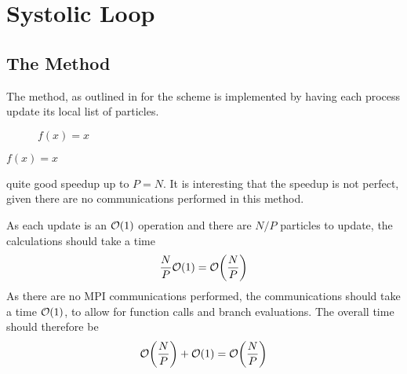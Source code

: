 \section{Systolic Loop}

%
%

\subsection{The \individualoperation{} Method}

The \individualoperation{} method, as outlined in
for the \systolicloop{} scheme
is implemented by having each process update its local list of particles.


%
%
\begin{figure}[!h]
    
    \caption{
        \vZeroSpeedupCaption
            {\systolicloop{}}
            {\individualoperation{}}
            {$f(x) = x$}
    }
    \label{fig:v0_systolic_individual_operation_speedups}
\end{figure}


\vZeroSpeedupExplanation
    {}
    {\systolicloop{}}
    {\individualoperation{}}
    {$f(x) = x$}


%

 quite good speedup
up to $P = N$.
%
It is interesting that the speedup is not perfect, given there are
no communications performed in this method.

%
As each update is an $\mathcal{O}{\left({ 1 }\right)}$ operation and there are $N/P$ particles
to update,
the calculations should take a time
\begin{equation}
    \frac{N}{P}\mathcal{O}{\left({ 1 }\right)} = \mathcal{O}{\left({ \frac{N}{P} }\right)}
\end  {equation}
%
As there are no MPI communications performed, the communications should
take a time $\mathcal{O}{\left({ 1 }\right)}$, to allow for function calls and branch evaluations.
%
The overall time should therefore be
\begin{equation}
    \mathcal{O}{\left({ \frac{N}{P} }\right)} + \mathcal{O}{\left({ 1 }\right)} = \mathcal{O}{\left({ \frac{N}{P} }\right)}
\end{equation}


